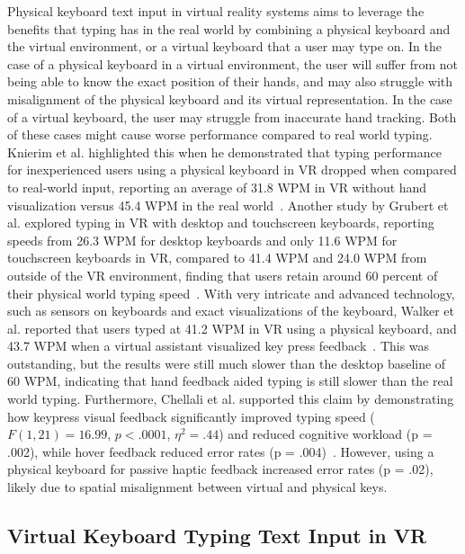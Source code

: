 \documentclass[acmlarge]{acmart}
\begin{document}
Physical keyboard text input in virtual reality systems aims to leverage the benefits that typing has in the real world by combining a physical keyboard and the virtual environment, or a virtual keyboard that a user may type on. In the case of a physical keyboard in a virtual environment, the user will suffer from not being able to know the exact position of their hands, and may also struggle with misalignment of the physical keyboard and its virtual representation. In the case of a virtual keyboard, the user may struggle from inaccurate hand tracking. Both of these cases might cause worse performance compared to real world typing. Knierim et al. highlighted this when he demonstrated that typing performance for inexperienced users using a physical keyboard in VR dropped when compared to real-world input, reporting an average of 31.8 WPM in VR without hand visualization versus 45.4 WPM in the real world~\cite{Knierim2018}. Another study by Grubert et al. explored typing in VR with desktop and touchscreen keyboards, reporting speeds from 26.3 WPM for desktop keyboards and only 11.6 WPM for touchscreen keyboards in VR, compared to 41.4 WPM and 24.0 WPM from outside of the VR environment, finding that users retain around 60 percent of their physical world typing speed~\cite{Grubert2018}. With very intricate and advanced technology, such as sensors on keyboards and exact visualizations of the keyboard, Walker et al. reported that users typed at 41.2 WPM in VR using a physical keyboard, and 43.7 WPM when a virtual assistant visualized key press feedback~\cite{Walker2017}. This was outstanding, but the results were still much slower than the desktop baseline of 60 WPM, indicating that hand feedback aided typing is still slower than the real world typing. Furthermore, Chellali et al. supported this claim by demonstrating how keypress visual feedback significantly improved typing speed ($F(1,21) = 16.99$, $p < .0001$, $\eta^2 = .44$) and reduced cognitive workload (p = .002), while hover feedback reduced error rates (p = .004)~\cite{Chellali2025}. However, using a physical keyboard for passive haptic feedback increased error rates (p = .02), likely due to spatial misalignment between virtual and physical keys.




\subsection{Virtual Keyboard Typing Text Input in VR}
\end{document}

